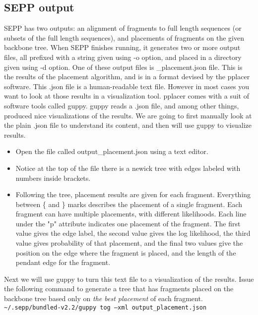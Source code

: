 \documentclass[11pt]{article} %
\newcommand{\sepp}{SEPP\xspace}
\newcommand{\ins}[1]{{\tt #1}}
\newcommand{\file}[1]{{\sf #1}}
\newcommand{\pplacer}{pplacer\xspace}
\newcommand{\guppy}{guppy\xspace}
\newcommand{\sbun}{\textasciitilde/.sepp/bundled-v2.2}
\begin{document}
\subsection{\sepp output }
\sepp has two outputs: an alignment of fragments to full length sequences (or subsets of the full length sequences), and placements of fragments on the given backbone tree. When \sepp finishes running, it generates two or more output files, all prefixed with a string given using -o option, and placed in a directory given using -d option. One of these output files is \file{[prefix]\_placement.json} file. This is the results of the placement algorithm, and is in a format devised by the \pplacer software. This .json file is a human-readable text file. However in most cases you want to look at those results in a visualization tool. \pplacer comes with a suit of software tools called \guppy. \guppy reads a \file{.json} file, and among other things, produced nice visualizations of the results. We are going to first manually look at the plain \file{.json} file to understand its content, and then will use \guppy to visualize results.   

\begin{itemize}
\item Open the file called \file{output\_placement.json} using a text editor. 
\item Notice at the top of the file there is a newick tree with edges labeled with numbers inside brackets. 
\item Following the tree, placement results are given for each fragment.  Everything between \{ and \} marks describes the placement of a single fragment. Each fragment can have multiple placements, with different likelihoods. Each line under the "p" attribute indicates one placement of the fragment. The first value gives the edge label, the second value gives the log likelihood, the third value gives probability of that placement, and the final two values give the position on the edge where the fragment is placed, and the length of the pendant edge for the fragment.
\end{itemize}

Next we will use \guppy to turn this text file to a visualization of the results. Issue the following command to generate a tree that has fragments placed on the backbone tree based only on {\em the best placement} of each fragment.\\

\ins{\sbun/guppy tog --xml output\_placement.json}\\
\end{document}
